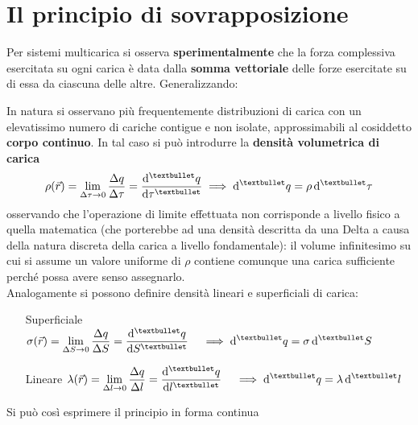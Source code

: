 \section{Il principio di sovrapposizione}
Per sistemi multicarica si osserva \textbf{sperimentalmente} che la forza complessiva esercitata su ogni carica è data dalla \textbf{somma vettoriale} delle forze esercitate su di essa da ciascuna delle altre. Generalizzando:


In natura si osservano più frequentemente distribuzioni di carica con un elevatissimo numero di cariche contigue e non isolate, approssimabili al cosiddetto \textbf{corpo continuo}. In tal caso si può introdurre la \textbf{densità volumetrica di carica}
\[\rho(\vec{r}) = \limit{\Delta \tau}{0} \frac{\Delta q}{\Delta \tau} = \dv[•]{q}{\tau} \implies \dd[•]{q} = \rho \dd[•]{\tau}\]
osservando che l'operazione di limite effettuata non corrisponde a livello fisico a quella matematica (che porterebbe ad una densità descritta da una Delta a causa della natura discreta della carica a livello fondamentale): il volume infinitesimo su cui si assume un valore uniforme di $\rho$ contiene comunque una carica sufficiente perché possa avere senso assegnarlo.
\\Analogamente si possono definire densità lineari e superficiali di carica:
\begin{itemize}
\item[Superficiale] \hfill $\displaystyle \sigma(\vec{r}) = \limit{\Delta S}{0} \frac{\Delta q}{\Delta S} = \dv[•]{q}{S} \quad \implies \dd[•]{q} = \sigma \dd[•]{S}$
\item[Lineare] \hfill $\displaystyle \lambda(\vec{r}) = \limit{\Delta l}{0} \frac{\Delta q}{\Delta l} = \dv[•]{q}{l} \quad \implies \dd[•]{q} = \lambda \dd[•]{l}$
\end{itemize} 

Si può così esprimere il principio in forma continua


